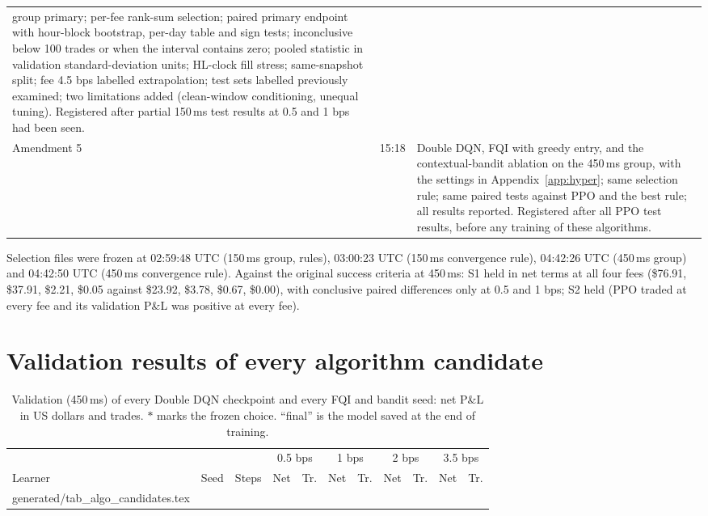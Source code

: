 \documentclass[12pt,a4paper]{article}
\makeatletter
\DeclareRobustCommand{\bps}{\ifmmode\,\text{bps}\else\,bps\fi}
\newcommand{\usd}[1]{\$#1}
\newcommand{\tabinput}[1]{\@@input #1 }
\makeatother
\begin{document}
\begin{table}[H]
\begin{tabularx}{\textwidth}{@{}l l >{\raggedright\arraybackslash}X@{}}
group primary; per-fee rank-sum selection; paired primary endpoint with hour-block bootstrap,
per-day table and sign tests; inconclusive below 100 trades or when the interval contains zero;
pooled statistic in validation standard-deviation units; HL-clock fill stress; same-snapshot
split; fee 4.5\bps{} labelled extrapolation; test sets labelled previously examined; two
limitations added (clean-window conditioning, unequal tuning). Registered after partial
150\,ms test results at 0.5 and 1\bps{} had been seen. \\
Amendment 5 & 15:18 & Double DQN, FQI with greedy entry, and the contextual-bandit ablation on
the 450\,ms group, with the settings in Appendix~\ref{app:hyper}; same selection rule; same
paired tests against PPO and the best rule; all results reported. Registered after all PPO test
results, before any training of these algorithms. \\
\bottomrule
\end{tabularx}
\end{table}

Selection files were frozen at 02:59:48 UTC (150\,ms group, rules), 03:00:23 UTC (150\,ms
convergence rule), 04:42:26 UTC (450\,ms group) and 04:42:50 UTC (450\,ms convergence rule).
Against the original success criteria at 450\,ms: S1 held in net terms at all four fees
(\usd{76.91}, \usd{37.91}, \usd{2.21}, \usd{0.05} against \usd{23.92}, \usd{3.78}, \usd{0.67},
\usd{0.00}), with conclusive paired differences only at 0.5 and 1\bps; S2 held (PPO traded at
every fee and its validation P\&L was positive at every fee).

\section{Validation results of every algorithm candidate}\label{app:candidates}
\begin{table}[H]
\centering
\caption{Validation (450\,ms) of every Double DQN checkpoint and every FQI and bandit seed:
net P\&L in US dollars and trades. $\ast$ marks the frozen choice. ``final'' is the model saved
at the end of training.}
\label{tab:candidates}
\small
\setlength{\tabcolsep}{3.5pt}
\begin{tabular}{@{}llrrrrrrrrr@{}}
\toprule
 & & & \multicolumn{2}{c}{0.5\bps} & \multicolumn{2}{c}{1\bps} & \multicolumn{2}{c}{2\bps} & \multicolumn{2}{c}{3.5\bps} \\
\cmidrule(lr){4-5}\cmidrule(lr){6-7}\cmidrule(lr){8-9}\cmidrule(l){10-11}
Learner & Seed & Steps & Net & Tr. & Net & Tr. & Net & Tr. & Net & Tr. \\
\midrule
\tabinput{generated/tab_algo_candidates.tex}
\bottomrule
\end{tabular}
\end{table}
\end{document}
